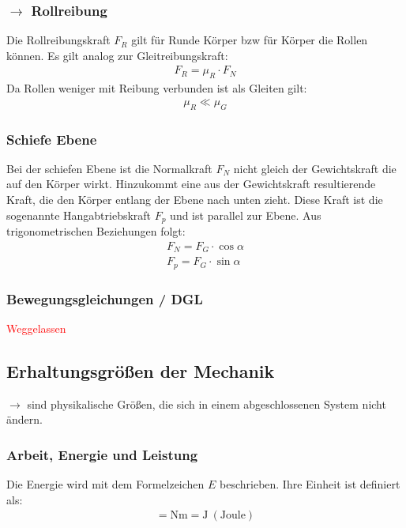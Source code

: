 \documentclass{article}
\begin{document}
\subsubsection*{$\rightarrow$ Rollreibung}
Die Rollreibungskraft $F_R$ gilt für Runde Körper bzw für Körper die Rollen können.
Es gilt analog zur Gleitreibungskraft:
\begin{align}
    F_{R}=\mu_R\cdot F_N
\end{align}
Da Rollen weniger mit Reibung verbunden ist als Gleiten gilt:
\begin{align}
    \mu_R\ll\mu_G
\end{align}

\subsubsection*{Schiefe Ebene}
Bei der schiefen Ebene ist die Normalkraft $F_N$ nicht gleich der Gewichtskraft die auf den Körper wirkt. 
Hinzukommt eine aus der Gewichtskraft resultierende Kraft, die den Körper entlang der Ebene nach unten zieht.
Diese Kraft ist die sogenannte Hangabtriebskraft $F_p$ und ist parallel zur Ebene.
Aus trigonometrischen Beziehungen folgt:
\begin{align}
    F_N=F_G\cdot \cos\alpha\\
    F_p=F_G\cdot \sin \alpha
\end{align}

\subsubsection{Bewegungsgleichungen / DGL}
\textcolor{red}{Weggelassen}

\subsection{Erhaltungsgrößen der Mechanik}
$\rightarrow$ sind physikalische Größen, die sich in einem abgeschlossenen System nicht ändern.

\subsubsection{Arbeit, Energie und Leistung}
Die Energie wird mit dem Formelzeichen $E$ beschrieben. Ihre Einheit ist definiert als:
\begin{align}
    [E]=\mathrm{Nm}=\mathrm{J}\ (\mathrm{Joule})
\end{align}
\end{document}
